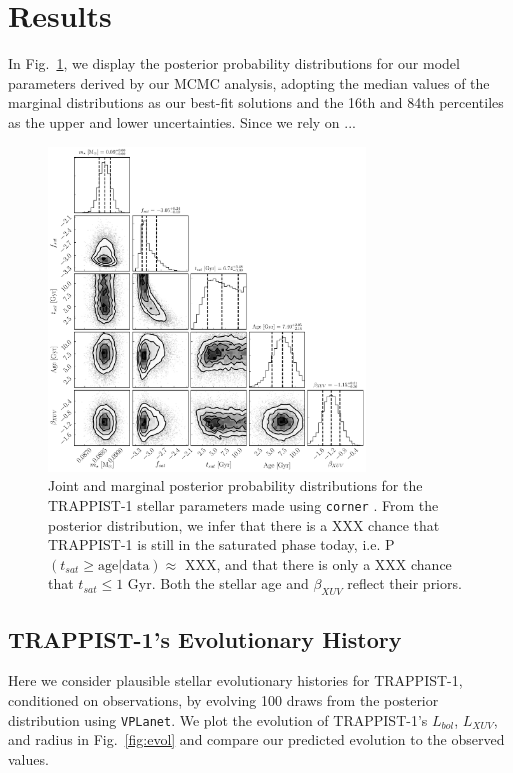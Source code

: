 \documentclass[twocolumn]{aastex62}
\newcommand{\vplanet}[0]{\texttt{VPLanet}\xspace}
\begin{document}

\section{Results} \label{sec:results}

In Fig.~\ref{fig:corner}, we display the posterior probability distributions for our model parameters derived by our MCMC analysis, adopting the median values of the marginal distributions as our best-fit solutions and the 16th and 84th percentiles as the upper and lower uncertainties. Since we rely on ... 

\begin{figure}[t]
\centering
	\includegraphics[width=0.75\textwidth]{../Analysis/Corner/trappist1Corner.pdf}
   \caption{Joint and marginal posterior probability distributions for the TRAPPIST-1 stellar parameters made using \texttt{corner} \citep{ForemanMackey2016}. From the posterior distribution, we infer that there is a XXX chance that TRAPPIST-1 is still in the saturated phase today, i.e. P$(t_{sat} \geq \mathrm{ age } | \mathrm{data}) \approx $ XXX, and that there is only a XXX chance that $t_{sat} \leq 1$ Gyr. Both the stellar age and $\beta_{XUV}$ reflect their priors.}%
    \label{fig:corner}%
\end{figure}

\subsection{TRAPPIST-1's Evolutionary History}

Here we consider plausible stellar evolutionary histories for TRAPPIST-1, conditioned on observations, by evolving 100 draws from the posterior distribution using \vplanet. We plot the evolution of TRAPPIST-1's $L_{bol}$, $L_{XUV}$, and radius in Fig.~\ref{fig:evol} and compare our predicted evolution to the observed values. 
\end{document}
